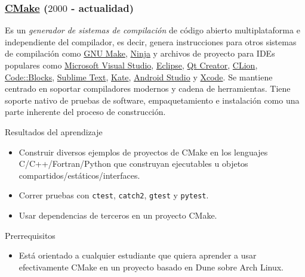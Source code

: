 




\begin{frame}[fragile]
	\frametitle{\href{https://cmake.org}{CMake} ($2000$ - actualidad)}
	Es un \emph{generador de sistemas de compilación} de código
	abierto multiplataforma e independiente del compilador, es decir,
	genera instrucciones para otros sistemas de compilación como
	\href{https://www.gnu.org/software/make}{GNU Make},
	\href{https://ninja-build.org}{Ninja}
	y archivos de proyecto para IDEs populares como
	\href{https://visualstudio.microsoft.com}{Microsoft Visual Studio},
	\href{https://eclipseide.org}{Eclipse},
	\href{https://www.qt.io/product/development-tools}{Qt Creator},
	\href{https://www.jetbrains.com/clion}{CLion},
	\href{https://www.codeblocks.org}{Code::Blocks},
	\href{https://www.sublimetext.com}{Sublime Text},
	\href{https://kate-editor.org}{Kate},
	\href{https://developer.android.com/studio}{Android Studio} y
	\href{https://developer.apple.com/xcode}{Xcode}.
	Se mantiene centrado en soportar compiladores modernos y cadena
	de herramientas.
	Tiene soporte nativo de pruebas de software, empaquetamiento e
	instalación como una parte inherente del proceso de construcción.

	\begin{block}{Resultados del aprendizaje}
		\begin{itemize}
			\item
			
			Construir diversos ejemplos de proyectos de CMake en los
			lenguajes C/C++/Fortran/Python que construyan ejecutables
			u objetos compartidos/estáticos/interfaces.
			
			\item
			
			Correr pruebas con \lstinline{ctest}, \lstinline{catch2},
			\lstinline{gtest} y \lstinline{pytest}.
			
			\item
			
			Usar dependencias de terceros en un proyecto CMake.
		\end{itemize}
	\end{block}

	\begin{block}{Prerrequisitos}
		\begin{itemize}
			\item

			Está orientado a cualquier estudiante que quiera aprender
			a usar efectivamente CMake en un proyecto basado en Dune
			sobre Arch Linux.
			

\end{itemize}
\end{block}
\end{frame}
